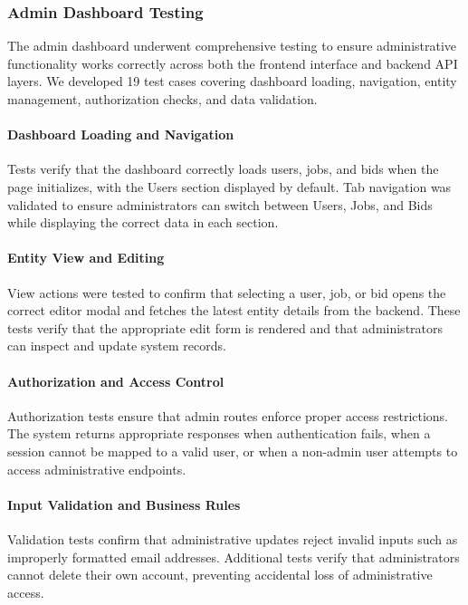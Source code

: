 \documentclass[11pt]{article}
\begin{document}
\subsubsection{Admin Dashboard Testing}
The admin dashboard underwent comprehensive testing to ensure administrative functionality works correctly across both the frontend interface and backend API layers. We developed 19 test cases covering dashboard loading, navigation, entity management, authorization checks, and data validation.

\paragraph{Dashboard Loading and Navigation}
Tests verify that the dashboard correctly loads users, jobs, and bids when the page initializes, with the Users section displayed by default. Tab navigation was validated to ensure administrators can switch between Users, Jobs, and Bids while displaying the correct data in each section.

\paragraph{Entity View and Editing}
View actions were tested to confirm that selecting a user, job, or bid opens the correct editor modal and fetches the latest entity details from the backend. These tests verify that the appropriate edit form is rendered and that administrators can inspect and update system records.

\paragraph{Authorization and Access Control}
Authorization tests ensure that admin routes enforce proper access restrictions. The system returns appropriate responses when authentication fails, when a session cannot be mapped to a valid user, or when a non-admin user attempts to access administrative endpoints.

\paragraph{Input Validation and Business Rules}
Validation tests confirm that administrative updates reject invalid inputs such as improperly formatted email addresses. Additional tests verify that administrators cannot delete their own account, preventing accidental loss of administrative access.
\end{document}
